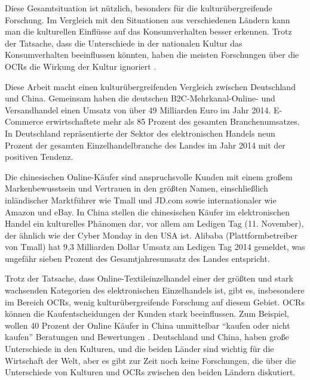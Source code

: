 Diese Gesamtsituation ist nützlich, besonders für die kulturübergreifende Forschung. Im Vergleich mit den Situationen aus verschiedenen Ländern kann man die kulturellen Einflüsse auf das Konsumverhalten besser erkennen. Trotz der Tatsache, dass die Unterschiede in der nationalen Kultur das Konsumverhalten beeinflussen könnten, haben die meisten Forschungen über die \ac{OCRs} die Wirkung der Kultur ignoriert \citep{gefen2006need}.

Diese Arbeit macht einen kulturübergreifenden Vergleich zwischen Deutschland und China. Gemeinsam haben die deutschen \acs{B2C}-Mehrkanal-Online- und Versandhandel einen Umsatz von über 49 Milliarden Euro im Jahr 2014. E-Commerce erwirtschaftete mehr als 85 Prozent des gesamten Branchenumsatzes. In Deutschland repräsentierte der Sektor des elektronischen Handels neun Prozent der gesamten Einzelhandelbranche des Landes im Jahr 2014 mit der positiven Tendenz. \citep{Spath2015}

Die chinesischen Online-Käufer sind anspruchsvolle Kunden mit einem großem Markenbewusstsein und Vertrauen in den größten Namen, einschließlich inländischer Marktführer wie Tmall und JD.com sowie internationaler wie Amazon und eBay. In China stellen die chinesischen Käufer im elektronischen Handel ein kulturelles Phänomen dar, vor allem am Ledigen Tag (11. November), der ähnlich wie der Cyber Monday in den USA ist. Alibaba (Plattformbetreiber von Tmall) hat 9,3 Milliarden Dollar Umsatz am Ledigen Tag 2014 gemeldet, was ungefähr sieben Prozent des Gesamtjahresumsatz des Landes entspricht. \citep{HanaBen-Shabat2015}

Trotz der Tatsache, dass Online-Textileinzelhandel einer der größten und stark wachsenden Kategorien des elektronischen Einzelhandels ist, gibt es, insbesondere im Bereich \acl{OCRs}, wenig kulturübergreifende Forschung auf diesem Gebiet. \ac{OCRs} können die Kaufentscheidungen der Kunden stark beeinflussen. Zum Beispiel, wollen 40 Prozent der Online Käufer in China unmittelbar ``kaufen oder nicht kaufen'' Beratungen und Bewertungen \citep{HanaBen-Shabat2015}. Deutschland und China, haben große Unterschiede in den Kulturen, und die beiden Länder sind wichtig für die Wirtschaft der Welt, aber es gibt zur Zeit noch keine Forschungen, die über die Unterschiede von Kulturen und \ac{OCRs} zwischen den beiden Ländern diskutiert.
